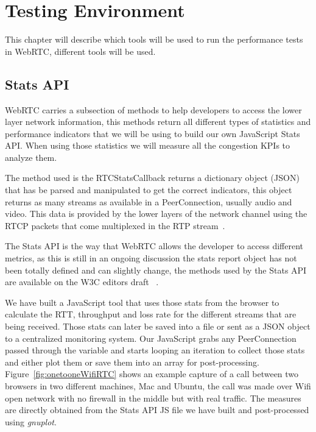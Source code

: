 \section{Testing Environment}
\label{sec:testingEnv}

\thispagestyle{empty}

This chapter will describe which tools will be used to run the performance tests in WebRTC, different tools will be used.

\subsection{Stats API}

WebRTC carries a subsection of methods to help developers to access the lower layer network information, this methods return all different types of statistics and performance indicators that we will be using to build our own JavaScript Stats API. When using those statistics we will measure all the congestion KPIs to analyze them.

The method used is the RTCStatsCallback returns a dictionary object (JSON) that has be parsed and manipulated to get the correct indicators, this object returns as many streams as available in a PeerConnection, usually audio and video. This data is provided by the lower layers of the network channel using the RTCP packets that come multiplexed in the RTP stream~\cite{rtpusageIETF}.

The Stats API is the way that WebRTC allows the developer to access different metrics, as this is still in an ongoing discussion the stats report object has not been totally defined and can slightly change, the methods used by the Stats API are available on the W3C editors draft ~\cite{editorWebRTCdraft}. 

We have built a JavaScript tool that uses those stats from the browser to calculate the RTT, throughput and loss rate for the different streams that are being received. Those stats can later be saved into a file or sent as a JSON object to a centralized monitoring system. Our JavaScript grabs any PeerConnection passed through the variable and starts looping an iteration to collect those stats and either plot them or save them into an array for post-processing. 

Figure~\ref{fig:onetooneWifiRTC} shows an example capture of a call between two browsers in two different machines, Mac and Ubuntu, the call was made over Wifi open network with no firewall in the middle but with real traffic. The measures are directly obtained from the Stats API JS file we have built and post-processed using {\it gnuplot}.


